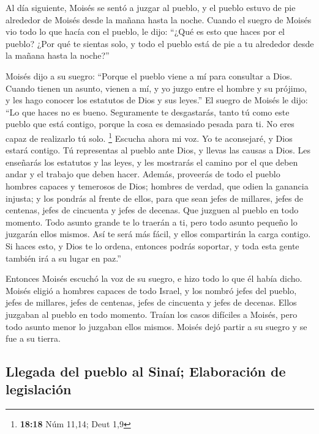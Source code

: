  Al día siguiente, Moisés se sentó a juzgar al pueblo, y
el pueblo estuvo de pie alrededor de Moisés desde la mañana hasta la
noche.  Cuando el suegro de Moisés vio todo lo que hacía
con el pueblo, le dijo: ``¿Qué es esto que haces por el pueblo? ¿Por qué
te sientas solo, y todo el pueblo está de pie a tu alrededor desde la
mañana hasta la noche?''

 Moisés dijo a su suegro: ``Porque el pueblo viene a mí
para consultar a Dios.  Cuando tienen un asunto, vienen a
mí, y yo juzgo entre el hombre y su prójimo, y les hago conocer los
estatutos de Dios y sus leyes.''  El suegro de Moisés le
dijo: ``Lo que haces no es bueno.  Seguramente te
desgastarás, tanto tú como este pueblo que está contigo, porque la cosa
es demasiado pesada para ti. No eres capaz de realizarlo tú solo.
\footnote{\textbf{18:18} Núm 11,14; Deut 1,9}  Escucha
ahora mi voz. Yo te aconsejaré, y Dios estará contigo. Tú representas al
pueblo ante Dios, y llevas las causas a Dios.  Les
enseñarás los estatutos y las leyes, y les mostrarás el camino por el
que deben andar y el trabajo que deben hacer.  Además,
proveerás de todo el pueblo hombres capaces y temerosos de Dios; hombres
de verdad, que odien la ganancia injusta; y los pondrás al frente de
ellos, para que sean jefes de millares, jefes de centenas, jefes de
cincuenta y jefes de decenas.  Que juzguen al pueblo en
todo momento. Todo asunto grande te lo traerán a ti, pero todo asunto
pequeño lo juzgarán ellos mismos. Así te será más fácil, y ellos
compartirán la carga contigo.  Si haces esto, y Dios te
lo ordena, entonces podrás soportar, y toda esta gente también irá a su
lugar en paz.''

 Entonces Moisés escuchó la voz de su suegro, e hizo todo
lo que él había dicho.  Moisés eligió a hombres capaces
de todo Israel, y los nombró jefes del pueblo, jefes de millares, jefes
de centenas, jefes de cincuenta y jefes de decenas. 
Ellos juzgaban al pueblo en todo momento. Traían los casos difíciles a
Moisés, pero todo asunto menor lo juzgaban ellos mismos. 
Moisés dejó partir a su suegro y se fue a su tierra.

\hypertarget{llegada-del-pueblo-al-sinauxed-elaboraciuxf3n-de-legislaciuxf3n}{%
\subsection{Llegada del pueblo al Sinaí; Elaboración de
legislación}\label{llegada-del-pueblo-al-sinauxed-elaboraciuxf3n-de-legislaciuxf3n}}

